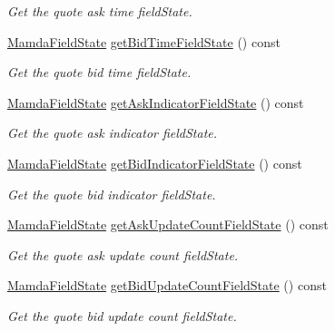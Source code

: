 \begin{CompactItemize}
\begin{CompactList}\small\item\em Get the quote ask time field\-State. \item\end{CompactList}\item 
\hyperlink{namespaceWombat_93aac974f2ab713554fd12a1fa3b7d2a}{Mamda\-Field\-State} \hyperlink{classWombat_1_1MamdaQuoteListener_a8d10456d404dc1ed3fe7231e89a62b3}{get\-Bid\-Time\-Field\-State} () const 
\begin{CompactList}\small\item\em Get the quote bid time field\-State. \item\end{CompactList}\item 
\hyperlink{namespaceWombat_93aac974f2ab713554fd12a1fa3b7d2a}{Mamda\-Field\-State} \hyperlink{classWombat_1_1MamdaQuoteListener_20c6b7c6cf1359fdd184a7d83bc93521}{get\-Ask\-Indicator\-Field\-State} () const 
\begin{CompactList}\small\item\em Get the quote ask indicator field\-State. \item\end{CompactList}\item 
\hyperlink{namespaceWombat_93aac974f2ab713554fd12a1fa3b7d2a}{Mamda\-Field\-State} \hyperlink{classWombat_1_1MamdaQuoteListener_276b02c48efaa043e0d394569fe68a02}{get\-Bid\-Indicator\-Field\-State} () const 
\begin{CompactList}\small\item\em Get the quote bid indicator field\-State. \item\end{CompactList}\item 
\hyperlink{namespaceWombat_93aac974f2ab713554fd12a1fa3b7d2a}{Mamda\-Field\-State} \hyperlink{classWombat_1_1MamdaQuoteListener_a9d06f74666624d69ff4e6303a626532}{get\-Ask\-Update\-Count\-Field\-State} () const 
\begin{CompactList}\small\item\em Get the quote ask update count field\-State. \item\end{CompactList}\item 
\hyperlink{namespaceWombat_93aac974f2ab713554fd12a1fa3b7d2a}{Mamda\-Field\-State} \hyperlink{classWombat_1_1MamdaQuoteListener_94564b543817c0a2c9a0711ae7e63ad5}{get\-Bid\-Update\-Count\-Field\-State} () const 
\begin{CompactList}\small\item\em Get the quote bid update count field\-State. \item\end{CompactList}\item 

\end{CompactItemize}
